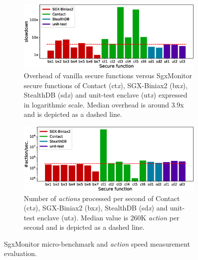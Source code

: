 \begin{figure}[t]
	\centering
	\begin{subfigure}[t]{.47\textwidth}
		\centering
		\includegraphics[width=\linewidth]{fig_c6/multiply.eps}
		\caption{Overhead of vanilla secure functions versus SgxMonitor 
			secure 
			functions of \textsf{Contact} (ct\emph{x}), \textsf{SGX-Biniax2} 
			(bx\emph{x}), \textsf{StealthDB} (sd\emph{x}) and 
			\textsf{unit-test} enclave (ut\emph{x}) expressed in logarithmic 
			scale. Median overhead is around $3.9$x and is depicted as a dashed 
			line.}
		\label{fig:multiply}
	\end{subfigure}
	\hfill
	\begin{subfigure}[t]{.47\textwidth}
		\centering
		\includegraphics[width=\linewidth]{fig_c6/action-second.eps}
		\caption{Number of \emph{actions} processed per second of 
			\textsf{Contact} (ct\emph{x}), \textsf{SGX-Biniax2} 
			(bx\emph{x}), \textsf{StealthDB} (sd\emph{x}) and 
			\textsf{unit-test} enclave (ut\emph{x}). Median value is $260$K 
			\emph{action} per second and is depicted as a dashed line.}
		\label{fig:action-second}
	\end{subfigure}
	\caption{SgxMonitor micro-benchmark and \emph{action} speed measurement 
		evaluation.}
	\label{fig:fig}
\end{figure}

